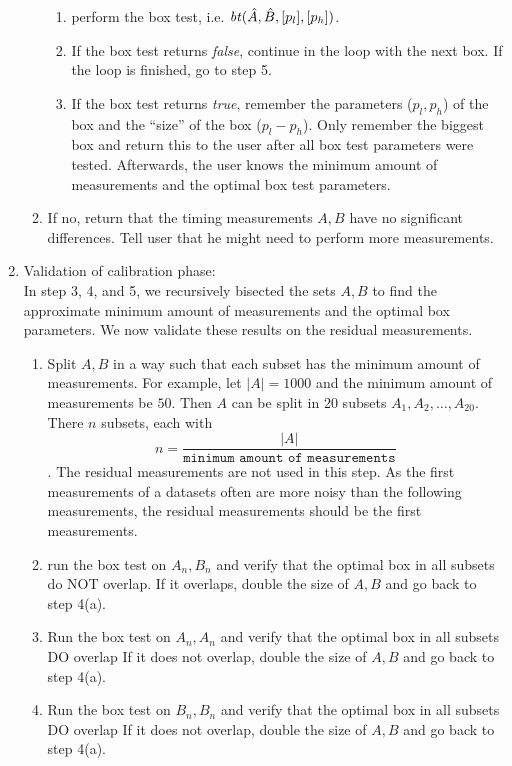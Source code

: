 \documentclass[12pt]{article}
\newcommand{\id}[1]{\mbox{\textit{#1}}}
\begin{document}
\begin{enumerate}
\begin{enumerate}
      \begin{enumerate}
        \item perform the box test, i.e. $\id{bt}(\hat{A}, \hat{B}, [p_l], [p_h])$.
        \item If the box test returns \id{false}, continue in the
          loop with the next box. If the loop is finished, go to step 5.
        \item If the box test returns \id{true}, remember the parameters ($p_l,p_h$) of the box and the
          ``size'' of the box ($p_l-p_h$). Only remember the biggest box and return this to the user after
          all box test parameters were tested. Afterwards, the user knows the minimum amount of measurements
          and the optimal box test parameters.
        \end{enumerate}
    \item If no, return that the timing measurements $A,B$ have no significant differences. Tell
    user that he might need to perform more measurements.
  \end{enumerate}


\item Validation of calibration phase:\\
  In step 3, 4, and 5, we recursively bisected the sets $A,B$ to find the approximate minimum amount of
  measurements and the optimal box parameters. We now validate these results on the residual measurements. 
  \begin{enumerate}
    \item Split $A,B$ in a way such that each subset has the minimum amount of measurements. For example, let
      $|A|=1000$ and the minimum amount of measurements be $50$. Then $A$ can be split in 20
      subsets $A_1, A_2, \ldots, A_20$. There $n$ subsets, each with 
      $$n=\frac{|A|}{\texttt{minimum amount of measurements}}$$.
      The residual measurements are not used in this step. As the first measurements of a datasets often
      are more noisy than the following measurements, the residual measurements should be the first 
      measurements.
    \item run the box test on $A_n,B_n$ and verify that the optimal box in all subsets do NOT overlap.
      If it overlaps, double the size of $A,B$ and go back to step 4(a).
    \item Run the box test on $A_n,A_n$ and verify that the optimal box in all subsets DO overlap
      If it does not overlap, double the size of $A,B$ and go back to step 4(a).
    \item Run the box test on $B_n,B_n$ and verify that the optimal box in all subsets DO overlap
      If it does not overlap, double the size of $A,B$ and go back to step 4(a).
  \end{enumerate}



\end{enumerate}
\end{document}
